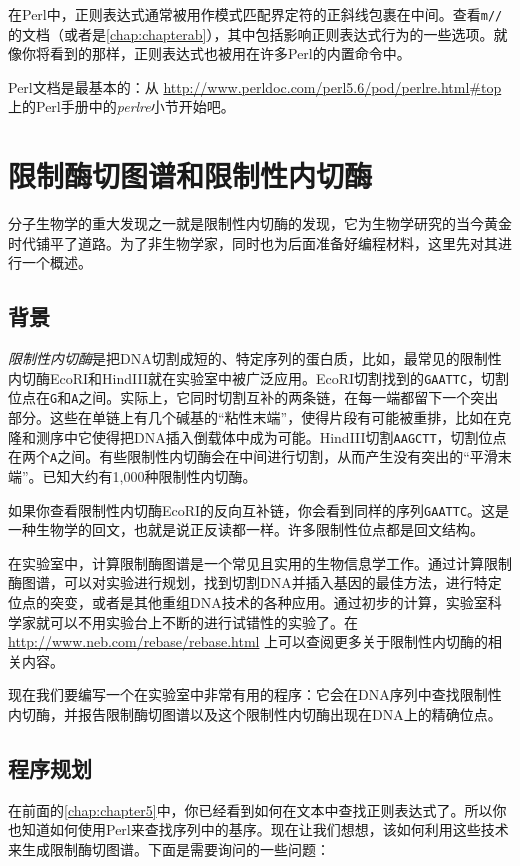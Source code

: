 在Perl中，正则表达式通常被用作模式匹配界定符的正斜线包裹在中间。查看\verb|m//|的文档（或者是\autoref{chap:chapterab}），其中包括影响正则表达式行为的一些选项。就像你将看到的那样，正则表达式也被用在许多Perl的内置命令中。

Perl文档是最基本的：从 \href{http://www.perldoc.com/perl5.6/pod/perlre.html\#top}{http://www.perldoc.com/perl5.6/pod/perlre.html\#top} 上的Perl手册中的\textit{perlre}小节开始吧。

\section{限制酶切图谱和限制性内切酶}
分子生物学的重大发现之一就是限制性内切酶的发现，它为生物学研究的当今黄金时代铺平了道路。为了非生物学家，同时也为后面准备好编程材料，这里先对其进行一个概述。

\subsection{背景}
\textit{限制性内切酶}是把DNA切割成短的、特定序列的蛋白质，比如，最常见的限制性内切酶EcoRI和HindIII就在实验室中被广泛应用。EcoRI切割找到的\verb|GAATTC|，切割位点在\verb|G|和\verb|A|之间。实际上，它同时切割互补的两条链，在每一端都留下一个突出部分。这些在单链上有几个碱基的“粘性末端”，使得片段有可能被重排，比如在克隆和测序中它使得把DNA插入倒载体中成为可能。HindIII切割\verb|AAGCTT|，切割位点在两个\verb|A|之间。有些限制性内切酶会在中间进行切割，从而产生没有突出的“平滑末端”。已知大约有1,000种限制性内切酶。

如果你查看限制性内切酶EcoRI的反向互补链，你会看到同样的序列\verb|GAATTC|。这是一种生物学的回文，也就是说正反读都一样。许多限制性位点都是回文结构。

在实验室中，计算限制酶图谱是一个常见且实用的生物信息学工作。通过计算限制酶图谱，可以对实验进行规划，找到切割DNA并插入基因的最佳方法，进行特定位点的突变，或者是其他重组DNA技术的各种应用。通过初步的计算，实验室科学家就可以不用实验台上不断的进行试错性的实验了。在 \href{http://www.neb.com/rebase/rebase.html}{http://www.neb.com/rebase/rebase.html} 上可以查阅更多关于限制性内切酶的相关内容。

现在我们要编写一个在实验室中非常有用的程序：它会在DNA序列中查找限制性内切酶，并报告限制酶切图谱以及这个限制性内切酶出现在DNA上的精确位点。

\subsection{程序规划}
在前面的\autoref{chap:chapter5}中，你已经看到如何在文本中查找正则表达式了。所以你也知道如何使用Perl来查找序列中的基序。现在让我们想想，该如何利用这些技术来生成限制酶切图谱。下面是需要询问的一些问题：

